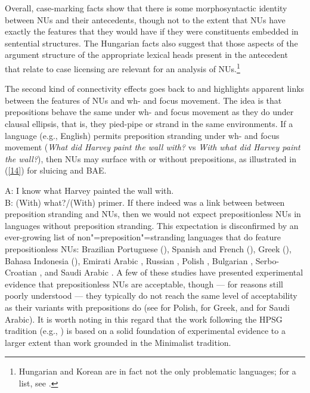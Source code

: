 \documentclass[output=paper
	        ,collection
	        ,collectionchapter
 	        ,biblatex
                ,babelshorthands
                ,newtxmath
                ,draftmode
                ,colorlinks, citecolor=brown
]{langscibook}
\begin{document}
{Overall, case-marking facts show that there is some morphosyntactic identity between NUs and their antecedents, though not to the extent that NUs have exactly the features that they would have if they were constituents embedded in sentential structures. The Hungarian facts also suggest that those aspects of the argument structure of the appropriate lexical heads present in the antecedent that relate to case licensing are relevant for an analysis of NUs.\footnote{Hungarian and Korean are in fact not the only problematic languages; for a list, see \citet{Vicente2015}.}

The second kind of connectivity effects goes back to \citet{Merchant2001, Merchant2005a} and highlights apparent links between the features of NUs and wh- and focus movement. The idea is that prepositions behave the same under wh- and focus movement as they do under clausal ellipsis, that is, they pied-pipe or strand in the same environments. If a language (e.g., English) permits preposition stranding under wh- and focus movement (\emph{What did Harvey paint the wall with?} vs \emph{With what did Harvey paint the wall?}), then NUs may surface with or without prepositions, as illustrated in (\ref{14}) for sluicing and BAE.

\ea A: I know what Harvey painted the wall with.\\B: (With) what?/(With) primer.\label{14}\z
If there indeed was a link between between preposition stranding and NUs, then we would not expect prepositionless NUs in languages without preposition stranding. This expectation is disconfirmed by an ever-growing list of non"=preposition"=stranding languages that do feature prepositionless NUs: Brazilian Portuguese (\citealt{AlmeidaYoshida2007}), Spanish and French (\citealt{Rodrigues2006}), Greek (\citealt{Molimpakis2018}), Bahasa Indonesia (\citealt{Fortin2007}), Emirati Arabic \citep{Leung2014}, Russian \citep{Philippova2014}, Polish \citep{Szczegielniak2008, Sag2011, Nykiel2013}, %
Bulgarian \citep{Abels2017}, Serbo-Croatian \citep{Stjepanovic2008, Stjepanovic2012}, and Saudi Arabic \citep{Alshaalan2020}. A few of these studies have presented experimental evidence that prepositionless NUs are acceptable, though --- for reasons still poorly understood --- they typically do not reach the same level of acceptability as their variants with prepositions do (see \citealt{Nykiel2013} for Polish, \citealt{Molimpakis2018} for Greek, and \citealt{Alshaalan2020} for Saudi Arabic). It is worth noting in this regard that the work following the HPSG tradition (e.g., \citealt{Sag2011}) is based on a solid foundation of experimental evidence to a larger extent than work grounded in the Minimalist tradition.

}
\end{document}
